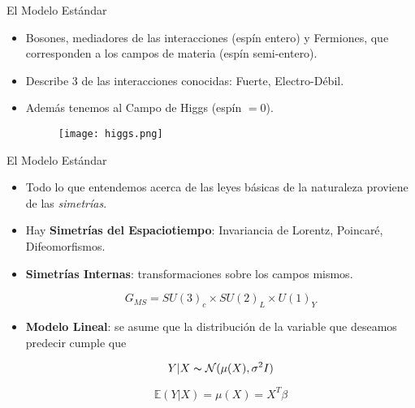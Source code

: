 \documentclass{beamer}
\begin{document}
\begin{frame}{El Modelo Estándar}
 \begin{itemize}
  \item
    Bosones, mediadores de las interacciones (espín entero) y Fermiones, que corresponden a los campos de materia (espín semi-entero).
   \item 
   Describe 3 de las interacciones conocidas: Fuerte, Electro-Débil.
   \item
   Además tenemos al Campo de Higgs (espín $= 0$).
\begin{figure}
\texttt{[image: higgs.png]}
\end{figure}
  \end{itemize}
\end{frame}

\begin{frame}{El Modelo Estándar}
 \begin{itemize}
  \item
    Todo lo que entendemos acerca de las leyes básicas de la naturaleza proviene de las \textit{simetrías}.
   \item 
   Hay {\bf{Simetrías del Espaciotiempo}}: Invariancia de Lorentz, Poincaré, Difeomorfismos.
   \item
   {\bf{Simetrías Internas}}: transformaciones sobre los campos mismos.
   \begin{exampleblock}{}
\[
G_{MS} = SU(3)_c \times SU(2)_L \times U(1)_Y  
\]
\end{exampleblock}

  \end{itemize}
\end{frame}

\begin{frame}{}
 \begin{itemize}
   \item
   {\bf{Modelo Lineal}}: se asume que la distribución de la variable que deseamos predecir cumple que 
 \begin{exampleblock}{}
\[
Y|X \thicksim \mathcal{N}(\mu(X) , \sigma^2 I)
\]
\end{exampleblock}

\begin{exampleblock}{}
\[
\mathbb{E}(Y|X) = \mu(X) = X^T \beta  
\]
\end{exampleblock}

  \end{itemize}
\end{frame}
\end{document}
